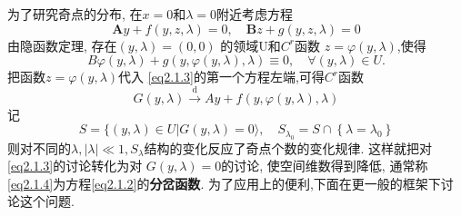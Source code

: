 为了研究奇点的分布,
在\(x=0\)和\(\lambda=0\)附近考虑方程
\begin{equation}
  \label{eq2.1.3}
  \mathbf{A}{y}+f(y, z, \lambda)=0,
  \quad
  \mathbf{B}z+g(y, z, \lambda)=0
\end{equation}
由隐函数定理,
存在\((y, \lambda)=(0,0)\)
的领域U和\(C^{r}\)函数
\(z=\varphi(y,\lambda)\),使得
\begin{equation*}
  B \varphi(y, \lambda)+g(y, \varphi(y, \lambda), \lambda) \equiv 0,
  \quad
  \forall(y, \lambda) \in U .
\end{equation*}
把函数\(z=\varphi(y,\lambda)\)代入
\ref{eq2.1.3}的第一个方程左端,可得\(C^{r}\)函数
\begin{equation}
  \label{eq2.1.4}
  G(y, \lambda) \stackrel{\mathrm{d}}{\longrightarrow} A y+f(y, \varphi(y, \lambda), \lambda)
\end{equation}
记
\begin{equation*}
  S=\{(y, \lambda) \in U | G(y, \lambda)=0\rangle,
  \quad
  S_{\lambda_{0}}=S  \cap\left\{\lambda=\lambda_{0}\right\}
\end{equation*}
则对不同的\(\lambda,|\lambda| \ll 1, S_{\lambda}\)结构的变化反应了奇点个数的变化规律.
这样就把对\ref{eq2.1.3}的讨论转化为对
\( G(y, \lambda)=0  \)的讨论,
使空间维数得到降低,
通常称\eqref{eq2.1.4}为方程\eqref{eq2.1.2}的\textbf{分岔函数}.
为了应用上的便利,下面在更一般的框架下讨论这个问题.
